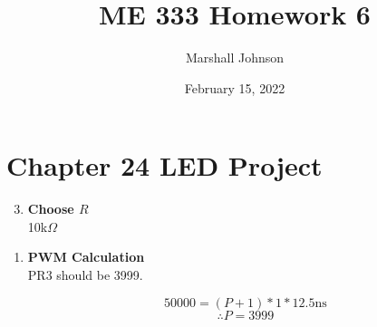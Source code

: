 \documentclass{article}
\title{ME 333 Homework 6}
\author{Marshall Johnson}
\date{February 15, 2022}
\begin{document}
\maketitle

\section*{Chapter 24 LED Project}

\begin{enumerate}[label=\textbf{24.1.2})]
    \setcounter{enumi}{2}
    \item \textbf{Choose $R$} \\
    
    10k$\Omega$

\end{enumerate}

\begin{enumerate}[label=\textbf{24.2.1})]
    \item \textbf{PWM Calculation} \\
    
    PR3 should be 3999.
    
    $$50000 = (P + 1) * 1 * 12.5 \text{ns}$$
    $$\therefore P = 3999$$ \\

\end{enumerate}
\end{document}
